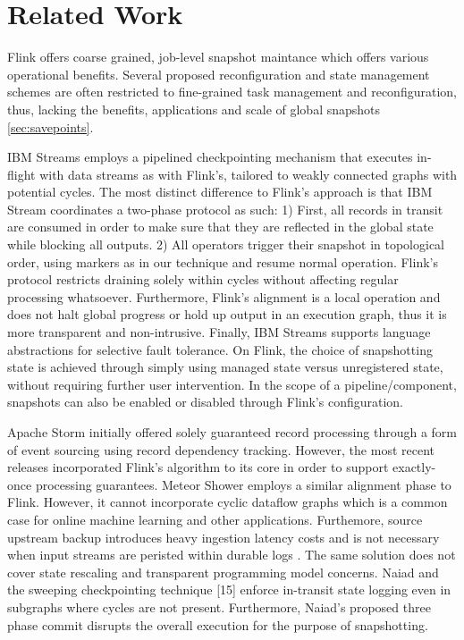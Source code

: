 
\section{Related Work}
\label{sec:related}
 Flink offers coarse grained, job-level snapshot maintance which offers various operational benefits. Several proposed reconfiguration and state management schemes \cite{castro2013integrating} are often restricted to fine-grained task management and reconfiguration, thus, lacking the benefits, applications and scale of global snapshots \autoref{sec:savepoints}.

IBM Streams employs a pipelined checkpointing mechanism \cite{jacques2016consistent} that executes in-flight with data streams as with Flink's, tailored to weakly connected graphs with potential cycles. The most distinct difference to Flink's approach is that IBM Stream coordinates a two-phase protocol as such: 1) First, all records in transit are consumed in order to make sure that they are reflected in the global state while blocking all outputs. 2) All operators trigger their snapshot in topological order, using markers as in our technique and resume normal operation. Flink's protocol restricts draining solely within cycles without affecting regular processing whatsoever. Furthermore, Flink's alignment is a local operation and does not halt global progress or hold up output in an execution graph, thus it is more transparent and non-intrusive. Finally, IBM Streams supports language abstractions for selective fault tolerance. On Flink, the choice of snapshotting state is achieved through simply using managed state versus unregistered state, without requiring further user intervention. In the scope of a pipeline/component, snapshots can also be enabled or disabled through Flink's configuration. 

Apache Storm \cite{CUSTOM:web/Storm} initially offered solely guaranteed record processing through a form of event sourcing using record dependency tracking. However, the most recent releases incorporated Flink's algorithm to its core \cite{CUSTOM:web/stormsux} in order to support exactly-once processing guarantees. Meteor Shower \cite{wang2012meteor} employs a similar alignment phase to Flink. However, it cannot incorporate cyclic dataflow graphs which is a common case for online machine learning \cite{de2015samoa} and other applications. Furthemore, source upstream backup introduces heavy ingestion latency costs and is not necessary when input streams are peristed within durable logs \cite{kreps2011kafka}. The same solution does not cover state rescaling and transparent programming model concerns. Naiad \cite{murray2013naiad} and the sweeping checkpointing technique [15] enforce in-transit state logging even in subgraphs where cycles are not present. Furthermore, Naiad's proposed three phase commit disrupts the overall execution for the purpose of snapshotting. 

